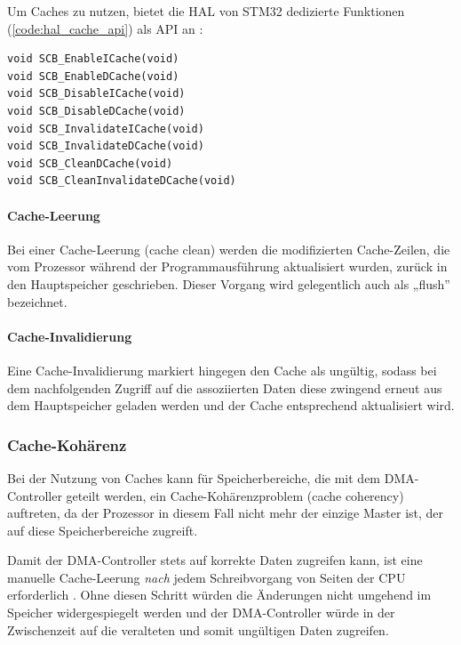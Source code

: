 Um Caches zu nutzen, bietet die \ac{HAL} von STM32 dedizierte Funktionen
(\ref{code:hal_cache_api}) als API an \cite[S. 4]{an4839}:

\begin{code}
\begin{verbatim}
void SCB_EnableICache(void)
void SCB_EnableDCache(void)
void SCB_DisableICache(void)
void SCB_DisableDCache(void)
void SCB_InvalidateICache(void)
void SCB_InvalidateDCache(void)
void SCB_CleanDCache(void)
void SCB_CleanInvalidateDCache(void)
\end{verbatim}
    \label{code:hal_cache_api}
\end{code}

\paragraph{Cache-Leerung}

Bei einer Cache-Leerung (cache clean) werden die modifizierten Cache-Zeilen, die
vom Prozessor während der Programmausführung aktualisiert wurden, zurück in den
Hauptspeicher geschrieben. Dieser Vorgang wird gelegentlich auch als „flush”
bezeichnet.

\paragraph{Cache-Invalidierung}

Eine Cache-Invalidierung markiert hingegen den Cache als ungültig, sodass bei
dem nachfolgenden Zugriff auf die assoziierten Daten diese zwingend erneut aus
dem Hauptspeicher geladen werden und der Cache entsprechend aktualisiert wird.

\subsubsection{Cache-Kohärenz} \label{sec:cache_coherency}

Bei der Nutzung von Caches kann für Speicherbereiche, die mit dem DMA-Controller
geteilt werden, ein Cache-Kohärenzproblem (cache coherency) auftreten, da der
Prozessor in diesem Fall nicht mehr der einzige Master ist, der auf diese
Speicherbereiche zugreift.

Damit der DMA-Controller stets auf korrekte Daten zugreifen kann, ist eine
manuelle Cache-Leerung \textit{nach} jedem Schreibvorgang von Seiten der CPU
erforderlich \cite[S. 6]{an4839}. Ohne diesen Schritt würden die Änderungen
nicht umgehend im Speicher widergespiegelt werden und der DMA-Controller würde
in der Zwischenzeit auf die veralteten und somit ungültigen Daten zugreifen.

